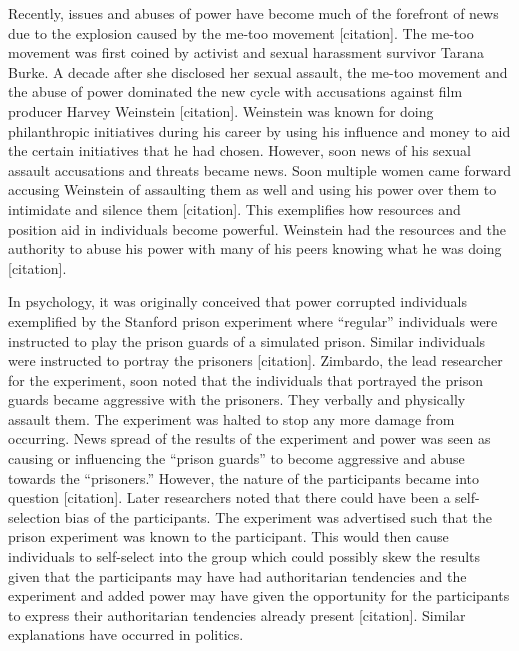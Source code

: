 \documentclass[
  english,
  donotrepeattitle,doc, 12pt, a4paper,floatsintext]{apa7}
\begin{document}
Recently, issues and abuses of power have become much of the forefront of news due to the explosion caused by the me-too movement {[}citation{]}. The me-too movement was first coined by activist and sexual harassment survivor Tarana Burke. A decade after she disclosed her sexual assault, the me-too movement and the abuse of power dominated the new cycle with accusations against film producer Harvey Weinstein {[}citation{]}. Weinstein was known for doing philanthropic initiatives during his career by using his influence and money to aid the certain initiatives that he had chosen. However, soon news of his sexual assault accusations and threats became news. Soon multiple women came forward accusing Weinstein of assaulting them as well and using his power over them to intimidate and silence them {[}citation{]}. This exemplifies how resources and position aid in individuals become powerful. Weinstein had the resources and the authority to abuse his power with many of his peers knowing what he was doing {[}citation{]}.

In psychology, it was originally conceived that power corrupted individuals exemplified by the Stanford prison experiment where ``regular'' individuals were instructed to play the prison guards of a simulated prison. Similar individuals were instructed to portray the prisoners {[}citation{]}. Zimbardo, the lead researcher for the experiment, soon noted that the individuals that portrayed the prison guards became aggressive with the prisoners. They verbally and physically assault them. The experiment was halted to stop any more damage from occurring. News spread of the results of the experiment and power was seen as causing or influencing the ``prison guards'' to become aggressive and abuse towards the ``prisoners.'' However, the nature of the participants became into question {[}citation{]}. Later researchers noted that there could have been a self-selection bias of the participants. The experiment was advertised such that the prison experiment was known to the participant. This would then cause individuals to self-select into the group which could possibly skew the results given that the participants may have had authoritarian tendencies and the experiment and added power may have given the opportunity for the participants to express their authoritarian tendencies already present {[}citation{]}. Similar explanations have occurred in politics.
\end{document}
